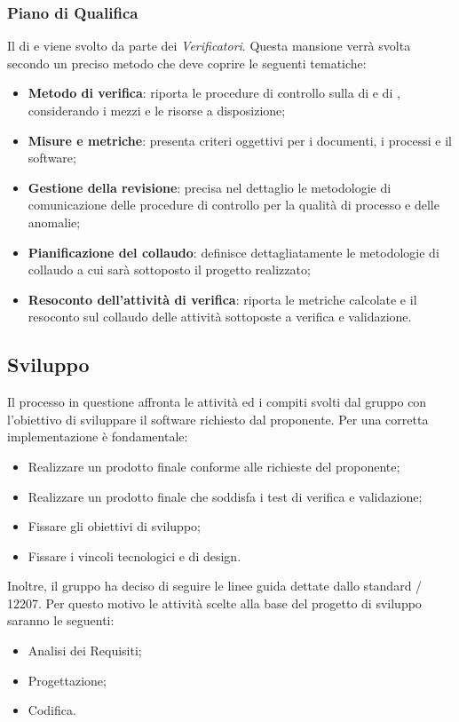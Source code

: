 \subsubsection{Piano di Qualifica}
Il  di  e  viene svolto da parte dei \emph{Verificatori}. Questa mansione verrà svolta secondo un preciso metodo che deve coprire le seguenti tematiche:
\begin{itemize}
	\item\textbf{{Metodo di verifica}}: riporta le procedure di controllo sulla  di  e di , considerando i mezzi e le risorse a disposizione;
	\item\textbf{{Misure e metriche}}: presenta criteri oggettivi per i documenti, i processi e il software;
	\item\textbf{{Gestione della revisione}}: precisa nel dettaglio le metodologie di comunicazione delle procedure di controllo per la qualità di processo e delle anomalie;
	\item\textbf{{Pianificazione del collaudo}}: definisce dettagliatamente le metodologie di collaudo a cui sarà sottoposto il progetto realizzato;
	\item\textbf{{Resoconto dell'attività di verifica}}: riporta le metriche calcolate e il resoconto sul collaudo delle attività sottoposte a verifica e validazione.
\end{itemize}
\subsection{Sviluppo}
Il processo in questione affronta le attività ed i compiti svolti dal gruppo con l'obiettivo di sviluppare il software richiesto dal proponente. Per una corretta implementazione è fondamentale:
\begin{itemize}
		\item Realizzare un prodotto finale conforme alle richieste del proponente;
		\item Realizzare un prodotto finale che soddisfa i test di verifica e validazione;
		\item Fissare gli obiettivi di sviluppo;
		\item Fissare i vincoli tecnologici e di design.
\end{itemize}
Inoltre, il gruppo ha deciso di seguire le linee guida dettate dallo standard / 12207. Per questo motivo le attività scelte alla base del progetto di sviluppo saranno le seguenti:
\begin{itemize}
	\item Analisi dei Requisiti;
	\item Progettazione;
	\item Codifica.
\end{itemize}
